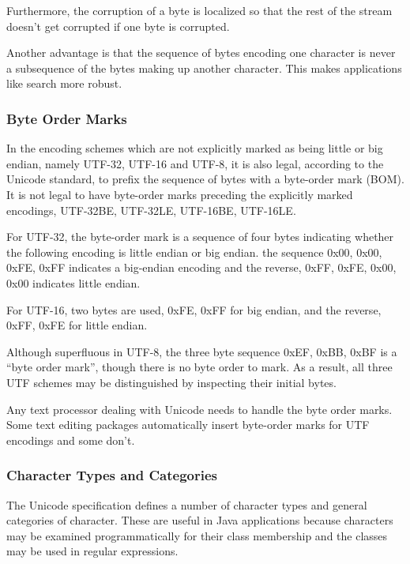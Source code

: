 Furthermore, the corruption of a byte is localized so that the rest of
the stream doesn't get corrupted if one byte is corrupted.

Another advantage is that the sequence of bytes encoding one character
is never a subsequence of the bytes making up another character.  This
makes applications like search more robust.


\subsubsection{Byte Order Marks}\label{section:byte-order-marks}

In the encoding schemes which are not explicitly marked as being
little or big endian, namely UTF-32, UTF-16 and UTF-8, it is also
legal, according to the Unicode standard, to prefix the sequence of
bytes with a byte-order mark (BOM).  It is not legal to have
byte-order marks preceding the explicitly marked encodings, UTF-32BE,
UTF-32LE, UTF-16BE, UTF-16LE.

For UTF-32, the byte-order mark is a sequence of four bytes indicating
whether the following encoding is little endian or big endian.  the
sequence 0x00, 0x00, 0xFE, 0xFF indicates a big-endian encoding and
the reverse, 0xFF, 0xFE, 0x00, 0x00 indicates little endian.

For UTF-16, two bytes are used, 0xFE, 0xFF for big endian, and the
reverse, 0xFF, 0xFE for little endian.

Although superfluous in UTF-8, the three byte sequence 0xEF, 0xBB,
0xBF is a ``byte order mark'', though there is no byte order to mark.  
As a result, all three UTF schemes may be distinguished by inspecting
their initial bytes.

Any text processor dealing with Unicode needs to handle the byte order
marks.  Some text editing packages automatically insert byte-order
marks for UTF encodings and some don't.

\subsubsection{Character Types and Categories}\label{section:unicode-categories}

The Unicode specification defines a number of character types and
general categories of character.  These are useful in Java
applications because characters may be examined programmatically for
their class membership and the classes may be used in regular
expressions.

